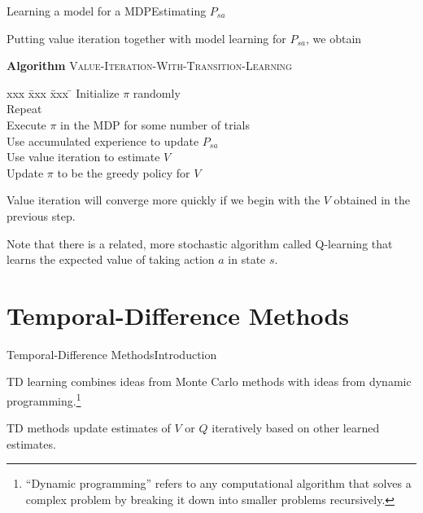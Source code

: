 \documentclass{beamer}
\begin{document}
\begin{frame}{Learning a model for a MDP}{Estimating $P_{sa}$}

  Putting value iteration together with model learning for $P_{sa}$, we obtain
  \begin{block}{\textbf{Algorithm} \textsc{Value-Iteration-With-Transition-Learning}}
    \begin{tabbing}
      xxx \= xxx \= xxx \= \kill
      \> Initialize $\pi$ randomly \\
      \> Repeat \\
      \> \> Execute $\pi$ in the MDP for some number of trials \\
      \> \> Use accumulated experience to update $P_{sa}$ \\
      \> \> Use value iteration to estimate $V$ \\
      \> \> Update $\pi$ to be the greedy policy for $V$ \\
    \end{tabbing}
  \end{block}

  \medskip

  Value iteration will converge more quickly if we begin with the $V$
  obtained in the previous step.

  \medskip

  Note that there is a related, more stochastic algorithm called
  \alert{Q-learning} that learns the expected value of taking action
  $a$ in state $s$.
  
\end{frame}

\section{Temporal-Difference Methods}

\begin{frame}{Temporal-Difference Methods}{Introduction}

  \alert{TD learning} combines ideas from Monte Carlo methods with
  ideas from dynamic programming.\footnote{``Dynamic programming''
    refers to any computational algorithm that
    solves a complex problem by breaking it down into smaller problems
    recursively.}

  \medskip

  TD methods update estimates of $V$ or $Q$ iteratively based on
  other learned estimates.

\end{frame}
\end{document}
